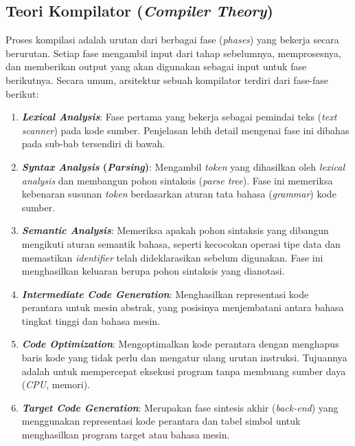 \documentclass[12pt,a4paper]{article}
\begin{document}
\subsection{Teori Kompilator (\textit{Compiler Theory})}

Proses kompilasi adalah urutan dari berbagai fase (\textit{phases}) yang bekerja secara berurutan. Setiap fase mengambil input dari tahap sebelumnya, memprosesnya, dan memberikan output yang akan digunakan sebagai input untuk fase berikutnya. Secara umum, arsitektur sebuah kompilator terdiri dari fase-fase berikut:

\begin{enumerate}
    \item \textbf{\textit{Lexical Analysis}}: Fase pertama yang bekerja sebagai
        pemindai teks (\textit{text scanner}) pada kode sumber. Penjelasan lebih detail mengenai fase ini dibahas pada sub-bab tersendiri di bawah.
    \item \textbf{\textit{Syntax Analysis} (\textit{Parsing})}: Mengambil
        \textit{token} yang dihasilkan oleh \textit{lexical analysis} dan
        membangun pohon sintaksis (\textit{parse tree}). Fase ini memeriksa
        kebenaran susunan \textit{token} berdasarkan aturan tata bahasa
        (\textit{grammar}) kode sumber.
    \item \textbf{\textit{Semantic Analysis}}: Memeriksa apakah pohon sintaksis
        yang dibangun mengikuti aturan semantik bahasa, seperti kecocokan
        operasi tipe data dan memastikan \textit{identifier} telah
        dideklarasikan sebelum digunakan. Fase ini menghasilkan keluaran berupa
        pohon sintaksis yang dianotasi.
    \item \textbf{\textit{Intermediate Code Generation}}: Menghasilkan
        representasi kode perantara untuk mesin abstrak, yang posisinya
        menjembatani antara bahasa tingkat tinggi dan bahasa mesin.
    \item \textbf{\textit{Code Optimization}}: Mengoptimalkan kode perantara
        dengan menghapus baris kode yang tidak perlu dan mengatur ulang urutan
        instruksi. Tujuannya adalah untuk mempercepat eksekusi program tanpa
        membuang sumber daya (\textit{CPU}, memori).
    \item \textbf{\textit{Target Code Generation}}: Merupakan fase sintesis
    akhir (\textit{back-end}) yang menggunakan representasi kode perantara dan
    tabel simbol untuk menghasilkan program target atau bahasa mesin.
\end{enumerate}
\end{document}
